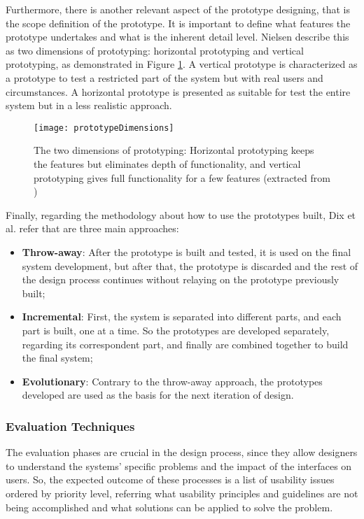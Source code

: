 Furthermore, there is another relevant aspect of the prototype designing, that is the scope definition of the prototype. It is important to define what features the prototype undertakes and what is the inherent detail level. Nielsen \cite{usabilityEngineering} describe this as two dimensions of prototyping: horizontal prototyping and vertical prototyping, as demonstrated in Figure \ref{fig:prototypeDimensions}. A vertical prototype is characterized as a prototype to test a restricted part of the system but with real users and circumstances. A horizontal prototype is presented as suitable for test the entire system but in a less realistic approach.

\begin{figure}[htbp]
	\centering
	\texttt{[image: prototypeDimensions]}
	\caption{The two dimensions of prototyping: Horizontal prototyping keeps the features but eliminates depth of functionality, and vertical prototyping gives full functionality for a few features (extracted from \cite{usabilityEngineering})}
	\label{fig:prototypeDimensions}
\end{figure}

Finally, regarding the methodology about how to use the prototypes built, Dix et al. \cite{humanComputerInteraction} refer that are three main approaches:

\begin{itemize}
	\item \textbf{Throw-away}: After the prototype is built and tested, it is used on the final system development, but after that, the prototype is discarded and the rest of the design process continues without relaying on the prototype previously built;
	\item \textbf{Incremental}: First, the system is separated into different parts, and each part is built, one at a time. So the prototypes are developed separately, regarding its correspondent part, and finally are combined together to build the final system;
	\item \textbf{Evolutionary}: Contrary to the throw-away approach, the prototypes developed are used as the basis for the next iteration of design.
\end{itemize}





\subsubsection{Evaluation Techniques}
\label{subsubsec:user_and_task_analysis}
The evaluation phases are crucial in the design process, since they allow designers to understand the systems' specific problems and the impact of the interfaces on users. So, the expected outcome of these processes is a list of usability issues ordered by priority level, referring what usability principles and guidelines are not being accomplished and what solutions can be applied to solve the problem. \cite{usabilityEngineering}  

